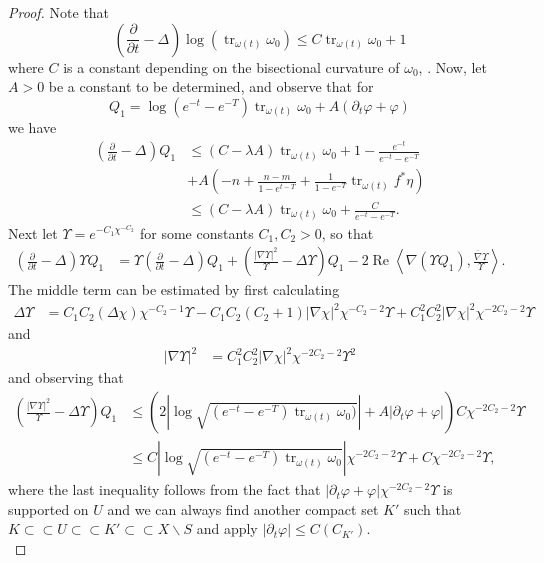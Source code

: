 \documentclass[12pt]{article}
\numberwithin{equation}{section}
\renewcommand{\d}{\partial}
\DeclareMathOperator{\tr}{tr}
\DeclareMathOperator{\Real}{Re}
\newcommand{\oo}[1]{\overline{#1}}
\newcommand{\parabolic}[1]{\left(\frac{\d}{\d t} - \Delta_{#1}\right)}
\newcommand{\ip}[1]{\left\langle#1\right\rangle}
\begin{document}
\begin{proof}
Note that
\begin{equation*}
    \parabolic{} \log(\tr_{\omega(t)} \omega_0) \leq C \tr_{\omega(t)} \omega_0 + 1
\end{equation*}
where $C$ is a constant depending on the bisectional curvature of $\omega_0$, \cite[Thm. 3.2.6]{BEG13}. Now, let $A > 0$ be a constant to be determined, and observe that for 
\begin{equation*}
    Q_1 = \log (e^{-t}-e^{-T}) \tr_{\omega(t)} \omega_0 + A(\d_t \varphi + \varphi)
\end{equation*}
we have
\begin{align*}
    \parabolic{}Q_1 &\leq (C - \lambda A) \tr_{\omega(t)} \omega_0 + 1 - \frac{e^{-t}}{e^{-t}-e^{-T}}\\
    &+A\left(-n + \frac{n-m}{1-e^{t-T}} + \frac{1}{1-e^{-T}} \tr_{\omega(t)} f^* \eta\right)\\
    & \leq (C - \lambda A)\tr_{\omega(t)} \omega_0 + \frac{C}{e^{-t}-e^{-T}}.
\end{align*}
Next let $\Upsilon = e^{-C_1\chi^{-C_2}}$ for some constants $C_1, C_2 > 0$, so that
\begin{align*}
    \parabolic{} \Upsilon Q_1 &= \Upsilon \parabolic{} Q_1 +\left(\frac{|\nabla \Upsilon|^2}{\Upsilon} -\Delta \Upsilon\right)Q_1 - 2 \Real \ip{\nabla (\Upsilon Q_1), \frac{\oo{\nabla} \Upsilon}{\Upsilon}}.
\end{align*}
The middle term can be estimated by first calculating
\begin{align*}
    \Delta \Upsilon &= C_1 C_2 (\Delta \chi) \chi^{-C_2-1}\Upsilon-C_1 C_2(C_2+1)|\nabla \chi|^2 \chi^{-C_2-2} \Upsilon+ C_1^2 C^2_2 |\nabla \chi|^2 \chi^{-2C_2-2} \Upsilon
\end{align*}
and
\begin{align*}
    |\nabla \Upsilon|^2 &= C_1^2C_2^2 |\nabla \chi|^2 \chi^{-2C_2-2} \Upsilon^2
\end{align*}
and observing that
\begin{align*}
    \left(\frac{|\nabla \Upsilon|^2}{\Upsilon} - \Delta \Upsilon\right) Q_1 &\leq \left(2 \left|\log \sqrt{(e^{-t}-e^{-T}) \tr_{\omega(t)} \omega_0)}\right| + A|\d_t \varphi + \varphi|\right) C \chi^{-2C_2-2}\Upsilon\\ 
    &\leq C \left|\log \sqrt{(e^{-t}-e^{-T})\tr_{\omega(t)} \omega_0} \right| \chi^{-2C_2-2}\Upsilon + C \chi^{-2C_2-2}\Upsilon,
\end{align*}
where the last inequality follows from the fact that $|\d_t \varphi + \varphi| \chi^{-2C_2-2}\Upsilon$ is supported on $U$ and we can always find another compact set $K'$ such that $K \subset \subset U \subset\subset K'  \subset \subset X \backslash S$ and apply $|\d_t \varphi| \leq C(C_{K'})$.\\

\end{proof}
\end{document}
